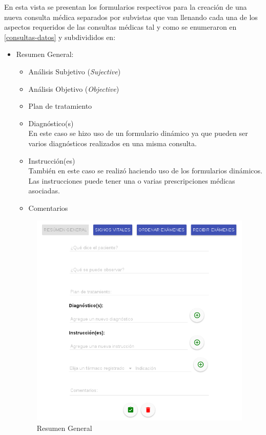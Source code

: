     En esta vista se presentan los formularios respectivos para la creación de una nueva consulta médica separados por subvistas que van llenando cada una de los aspectos requeridos de las consultas médicas tal y como se enumeraron en \ref{consultas-datos} y subdivididos en:
    
    \begin{itemize}
        \item Resumen General:
            \begin{itemize}
                \item Análisis Subjetivo (\textit{Sujective})
                \item Análisis Objetivo (\textit{Objective})
                \item Plan de tratamiento
                \item Diagnóstico(s)\\
                En este caso se hizo uso de un formulario dinámico ya que pueden ser varios diagnósticos realizados en una misma consulta.
                \item Instrucción(es)\\
                También en este caso se realizó haciendo uso de los formularios dinámicos. Las instrucciones puede tener una o varias prescripciones médicas asociadas.
                \item Comentarios
            \end{itemize}
            
            \begin{figure}[htb!]
                \begin{center}
                    \includegraphics[width=.9\linewidth,keepaspectratio=true]{figures/consulta1}
                \end{center}
                \caption{Resumen General}
                \label{img-revisiongeneral}
            \end{figure}
                

\end{itemize}
